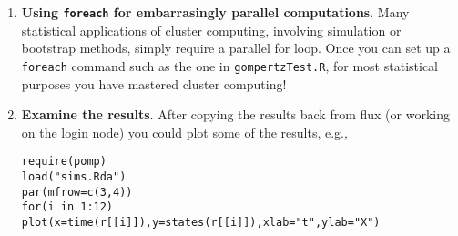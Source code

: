 \documentclass[12pt]{article}
\begin{document}
\begin{enumerate}
\item {\bf Using \texttt{foreach} for embarrasingly parallel computations}. Many statistical applications of cluster computing, involving simulation or bootstrap methods, simply require a parallel for loop. Once you can set up a \texttt{foreach} command such as the one in \texttt{gompertzTest.R}, for most statistical purposes you have mastered cluster computing!

\item {\bf Examine the results}. After copying the results back from flux (or working on the login node) you could plot some of the results, e.g., 
\begin{verbatim}
require(pomp)
load("sims.Rda")
par(mfrow=c(3,4))
for(i in 1:12) plot(x=time(r[[i]]),y=states(r[[i]]),xlab="t",ylab="X")
\end{verbatim}

\end{enumerate}
\end{document}
